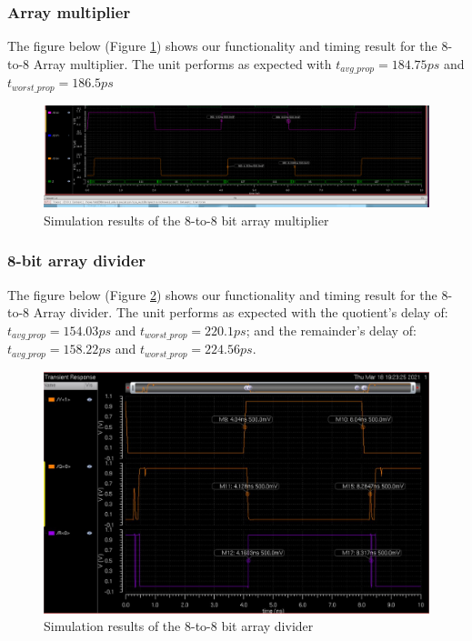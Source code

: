 \documentclass[letterpaper, 11pt]{article}
\begin{document}
	\subsubsection{Array multiplier}
	
	The figure below (Figure \ref{fig34}) shows our functionality and timing result for the 8-to-8 Array multiplier. The unit performs as expected with $t_{avg\_prop} = 184.75ps$ and $t_{worst\_prop} = 186.5ps$ 
	
	\begin{figure}[htb!]
		\centering
		\includegraphics[width=0.85\linewidth]{report_pics/8to8_mult_sim.png}
		\caption{Simulation results of the 8-to-8 bit array multiplier}
		\label{fig34}
	\end{figure}
	
	\subsubsection{8-bit array divider}
	
	The figure below (Figure \ref{fig35}) shows our functionality and timing result for the 8-to-8 Array divider. The unit performs as expected with the quotient's delay of: $t_{avg\_prop} = 154.03ps$ and $t_{worst\_prop} = 220.1ps$; and the remainder's delay of: $t_{avg\_prop} = 158.22ps$ and $t_{worst\_prop} = 224.56ps$.
	
	\begin{figure}[htb!]
		\centering
		\includegraphics[width=0.85\linewidth]{report_pics/div8b_sim.JPG}
		\caption{Simulation results of the 8-to-8 bit array divider}
		\label{fig35}
	\end{figure}
	
\end{document}
